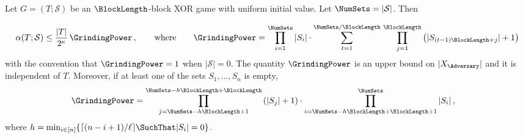 \begin{theorem}\label{thm:xor-game-block}
  Let $G = (T; \mathcal{S})$ be an $\BlockLength$-block XOR
  game with uniform initial value. Let $\NumSets = |\mathcal{S}|$.
  Then
  
  \begin{align*}%
    \alpha(T; \mathcal{S}) \leq \frac{|T|}{2^\kappa}\, \GrindingPower\,,
    \qquad\text{where}\qquad
    \GrindingPower =
        \prod_{i=1}^{\NumSets} |S_i| \cdot
            \sum_{t=1}^{\NumSets/\BlockLength}\,
                \prod_{j=1}^{\BlockLength} \left(|S_{ (t-1) \BlockLength + j}| + 1 \right)
  \end{align*}
  with the convention that $\GrindingPower = 1$ when $|\mathcal{S}| = 0$.
  The quantity $\GrindingPower$ is an upper bound on $|X_\Adversary|$ and it is independent of $T$. 
  Moreover, if at least one of the sets $S_1, \ldots, S_n$ is empty, 
  \begin{align}\label{eq:xor-game-block-gp}
      \GrindingPower &= 
        \prod_{j=\NumSets-h\BlockLength +1}^{\NumSets - h \BlockLength + \BlockLength}{(|S_j| + 1)} \cdot
        \prod_{i = \NumSets - h \BlockLength + \BlockLength + 1}^{\NumSets} |S_i|
        \,,
  \end{align}
  where $h = \min_{i \in [n]}\{\lceil (n - i + 1)/ \ell \rceil \SuchThat |S_i| = 0\}$.
\end{theorem}
